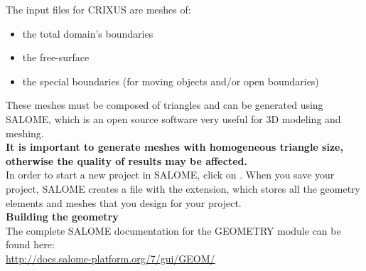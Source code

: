 The input files for CRIXUS are meshes of:
\begin{itemize}
\item the total domain's boundaries
\item the free-surface
\item the special boundaries (for moving objects 
and/or open boundaries)
\end{itemize}
These meshes must be composed of triangles and can 
be generated using SALOME, which is an open source 
software very useful for 3D modeling and meshing.\\

\textbf{It is important to generate meshes with homogeneous 
triangle size, otherwise the quality of results may be affected.}\\


In order to start a new project in SALOME, click on . 
When you save your project, SALOME creates a file with the 
 extension, which stores all the geometry elements 
and meshes that you design for your project.\\

\textbf{Building the geometry}\\

The complete SALOME documentation for the GEOMETRY module can be found here:\\
\url{http://docs.salome-platform.org/7/gui/GEOM/}\\

